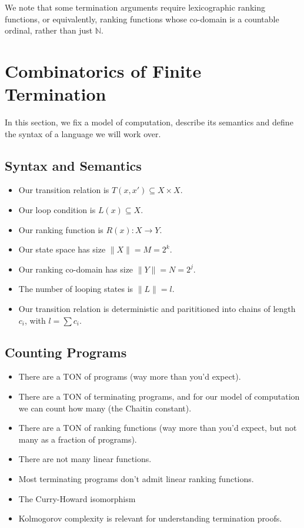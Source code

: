 \documentclass[preprint]{sigplanconf}
\theoremstyle{definition}
\begin{document}
We note that some termination arguments require lexicographic ranking functions, or
equivalently, ranking functions whose co-domain is a countable ordinal, rather than just $\mathbb{N}$.



\iffalse
\section{Combinatorics of Finite Termination}
In this section, we fix a model of computation, describe its semantics and
define the syntax of a language we will work over.

\subsection{Syntax and Semantics}

\begin{itemize}
 \item Our transition relation is $T(x, x') \subseteq X \times X$.
 \item Our loop condition is $L(x) \subseteq X$.
 \item Our ranking function is $R(x) : X \to Y$.
 \item Our state space has size $\| X \| = M = 2^k$.
 \item Our ranking co-domain has size $\| Y \| = N = 2^j$.
 \item The number of looping states is $\| L \| = l$.
 \item Our transition relation is deterministic and parititioned into chains of length $c_i$, with $l = \sum c_i$.
\end{itemize}

\subsection{Counting Programs}
\begin{itemize}
 \item There are a TON of programs (way more than you'd expect).
 \item There are a TON of terminating programs, and for our model of computation we can count
  how many (the Chaitin constant).
 \item There are a TON of ranking functions (way more than you'd expect, but not many as a
  fraction of programs).
 \item There are not many linear functions.
 \item Most terminating programs don't admit linear ranking functions.
 \item The Curry-Howard isomorphism
 \item Kolmogorov complexity is relevant for understanding termination proofs.
\end{itemize}
\end{document}
